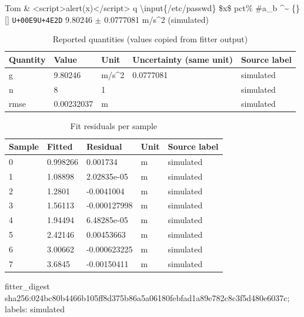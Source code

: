 \documentclass[11pt]{article}
\begin{document}
Tom \& \textless{}script\textgreater{}alert(x)\textless{}/script\textgreater{} {\ttfamily{}}q{\ttfamily{}} \textbackslash{}input\{/etc/passwd\} \$x\$ pct\% \#a\_b \textasciicircum{}\textasciitilde{} \{\}{[}{]} \texttt{U+00E9}\texttt{U+4E2D} 9.80246 $\pm$ 0.0777081 m/s\textasciicircum{}2 (simulated)
\begin{longtable}{lllll}
\caption{Reported quantities (values copied from fitter output)}\\ \hline
Quantity & Value & Unit & Uncertainty (same unit) & Source label \\ \hline \endhead
g & 9.80246 & m/s\textasciicircum{}2 & 0.0777081 & simulated \\
n & 8 & 1 &  & simulated \\
rmse & 0.00232037 & m &  & simulated \\
\hline\end{longtable}
\begin{longtable}{lllll}
\caption{Fit residuals per sample}\\ \hline
Sample & Fitted & Residual & Unit & Source label \\ \hline \endhead
0 & 0.998266 & 0.001734 & m & simulated \\
1 & 1.08898 & 2.02835e-05 & m & simulated \\
2 & 1.2801 & -0.0041004 & m & simulated \\
3 & 1.56113 & -0.000127998 & m & simulated \\
4 & 1.94494 & 6.48285e-05 & m & simulated \\
5 & 2.42146 & 0.00453663 & m & simulated \\
6 & 3.00662 & -0.000623225 & m & simulated \\
7 & 3.6845 & -0.00150411 & m & simulated \\
\hline\end{longtable}
\noindent fitter\_digest sha256:024bc80b4466b105ff8d375b86a5a06180febfad1a89e782c8c3f5d480e6037c; labels: simulated
\end{document}
